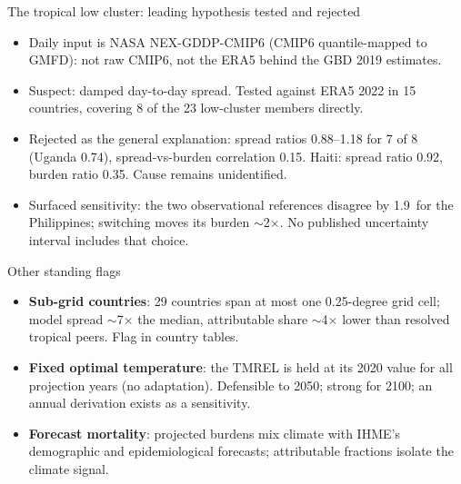 \documentclass[aspectratio=169,11pt]{beamer}
\begin{document}
\begin{frame}{The tropical low cluster: leading hypothesis tested and rejected}
  \begin{itemize}
    \item Daily input is NASA NEX-GDDP-CMIP6 (CMIP6 quantile-mapped to
      GMFD): not raw CMIP6, not the ERA5 behind the GBD 2019 estimates.
    \item Suspect: damped day-to-day spread. Tested against ERA5 2022 in 15
      countries, covering 8 of the 23 low-cluster members directly.
    \item \alert{Rejected as the general explanation}: spread ratios
      0.88--1.18 for 7 of 8 (Uganda 0.74), spread-vs-burden correlation
      0.15. Haiti: spread ratio 0.92, burden ratio 0.35. Cause remains
      unidentified.
    \item Surfaced sensitivity: the two observational references disagree
      by 1.9\,\textcelsius{} for the Philippines; switching moves its
      burden \(\sim\)2\(\times\). No published uncertainty interval
      includes that choice.
  \end{itemize}
\end{frame}

\begin{frame}{Other standing flags}
  \begin{itemize}
    \item \textbf{Sub-grid countries}: 29 countries span at most one
      0.25-degree grid cell; model spread \(\sim\)7\(\times\) the median,
      attributable share \(\sim\)4\(\times\) lower than resolved tropical
      peers. Flag in country tables.
    \item \textbf{Fixed optimal temperature}: the TMREL is held at its 2020
      value for all projection years (no adaptation). Defensible to 2050;
      strong for 2100; an annual derivation exists as a sensitivity.
    \item \textbf{Forecast mortality}: projected burdens mix climate with
      IHME's demographic and epidemiological forecasts; attributable
      fractions isolate the climate signal.
  \end{itemize}
\end{frame}

\end{document}
